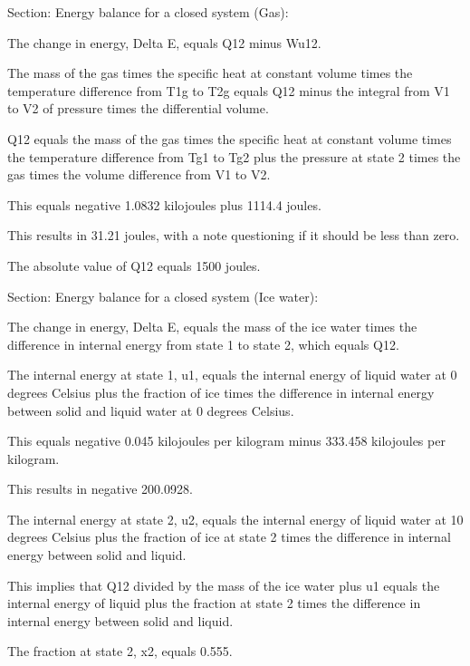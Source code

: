 Section: Energy balance for a closed system (Gas):

The change in energy, Delta E, equals Q12 minus Wu12.

The mass of the gas times the specific heat at constant volume times the temperature difference from T1g to T2g equals Q12 minus the integral from V1 to V2 of pressure times the differential volume.

Q12 equals the mass of the gas times the specific heat at constant volume times the temperature difference from Tg1 to Tg2 plus the pressure at state 2 times the gas times the volume difference from V1 to V2.

This equals negative 1.0832 kilojoules plus 1114.4 joules.

This results in 31.21 joules, with a note questioning if it should be less than zero.

The absolute value of Q12 equals 1500 joules.

Section: Energy balance for a closed system (Ice water):

The change in energy, Delta E, equals the mass of the ice water times the difference in internal energy from state 1 to state 2, which equals Q12.

The internal energy at state 1, u1, equals the internal energy of liquid water at 0 degrees Celsius plus the fraction of ice times the difference in internal energy between solid and liquid water at 0 degrees Celsius.

This equals negative 0.045 kilojoules per kilogram minus 333.458 kilojoules per kilogram.

This results in negative 200.0928.

The internal energy at state 2, u2, equals the internal energy of liquid water at 10 degrees Celsius plus the fraction of ice at state 2 times the difference in internal energy between solid and liquid.

This implies that Q12 divided by the mass of the ice water plus u1 equals the internal energy of liquid plus the fraction at state 2 times the difference in internal energy between solid and liquid.

The fraction at state 2, x2, equals 0.555.